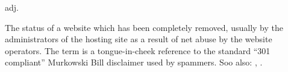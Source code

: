  adj.

The status of a website which has been completely removed, usually by
the administrators of the hosting site as a result of net abuse by the
website operators. The term is a tongue-in-cheek reference to the
standard ``301 compliant'' Murkowski Bill disclaimer used by spammers.
Soo also: , .

